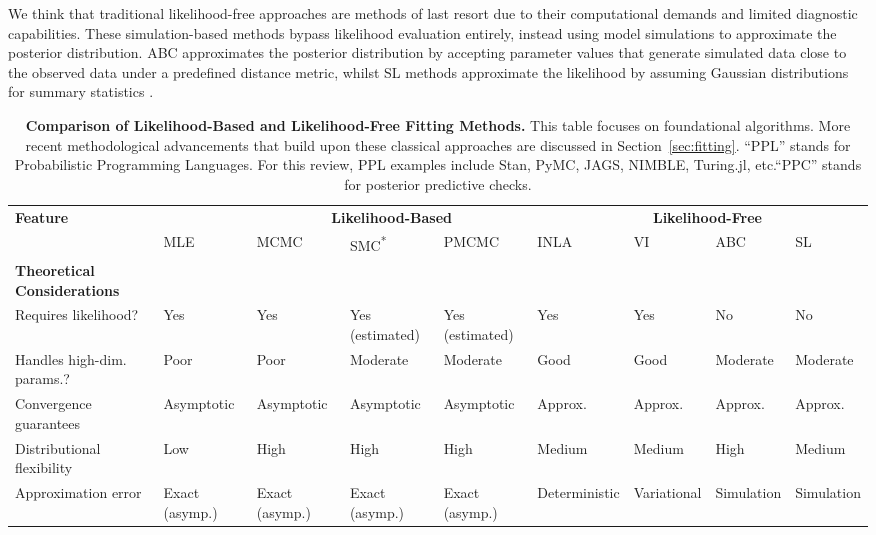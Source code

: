 \documentclass{article}
\begin{document}
We think that traditional likelihood-free approaches are methods of last resort due to their computational demands and limited diagnostic capabilities.
These simulation-based methods bypass likelihood evaluation entirely, instead using model simulations to approximate the posterior distribution.
\ac{ABC} approximates the posterior distribution by accepting parameter values that generate simulated data close to the observed data under a predefined distance metric, whilst \ac{SL} methods approximate the likelihood by assuming Gaussian distributions for summary statistics \citep{beaumont2002approximate, wood2010statistical, price2018bayesian}. 

\begin{landscape}
\begin{table}[ht]
\renewcommand{\arraystretch}{1.2}
\centering
\caption{\textbf{Comparison of Likelihood-Based and Likelihood-Free Fitting Methods.} 
This table focuses on foundational algorithms. More recent methodological advancements that build upon these classical approaches are discussed in Section~\ref{sec:fitting}. ``PPL'' stands for Probabilistic Programming Languages. For this review, PPL examples include Stan, PyMC, JAGS, NIMBLE, Turing.jl, etc.``PPC'' stands for posterior predictive checks.}
\label{tab:methods_comparison}
\small
\begin{tabular}{@{}p{3.5cm}p{1.5cm}p{1.5cm}p{2.2cm}p{2.2cm}p{1.5cm}p{1.5cm}p{1.5cm}p{1.5cm}@{}}
\toprule
\multirow{2}{*}{\textbf{Feature}} & \multicolumn{5}{c}{\textbf{Likelihood-Based}} & \multicolumn{2}{c}{\textbf{Likelihood-Free}} \\
\cmidrule(lr){2-7} \cmidrule(lr){8-9}
 & \ac{MLE} & \ac{MCMC} & \ac{SMC}\textsuperscript{*}  & \ac{PMCMC} & \ac{INLA} & \ac{VI} & \ac{ABC} & \ac{SL} \\
\midrule
\textbf{Theoretical Considerations} & & & & & & & & \\
\midrule
Requires likelihood? & Yes & Yes  & Yes (estimated) & Yes (estimated) & Yes & Yes & No & No \\
Handles high-dim. params.? & Poor &Poor & Moderate & Moderate & Good & Good & Moderate & Moderate \\
Convergence guarantees & Asymptotic & Asymptotic & Asymptotic & Asymptotic & Approx. & Approx. & Approx. & Approx. \\
Distributional flexibility & Low & High & High & High & Medium & Medium & High & Medium \\
Approximation error & Exact (asymp.) & Exact (asymp.) & Exact (asymp.) & Exact (asymp.)& Deterministic & Variational & Simulation & Simulation \\

\end{tabular}
\end{table}
\end{landscape}
\end{document}
